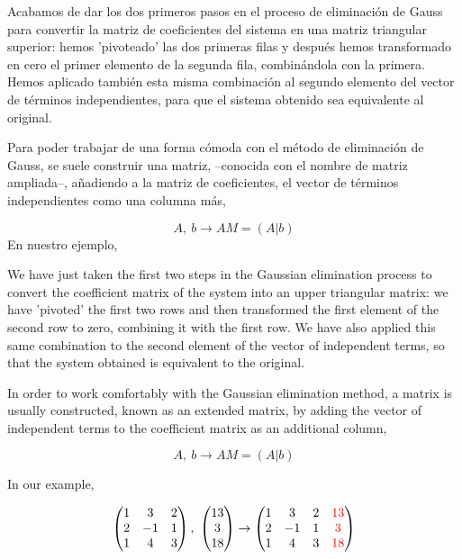 \begin{paracol}{2}
Acabamos de dar los dos primeros pasos en el proceso de eliminación de Gauss para convertir la matriz de coeficientes del sistema en una matriz triangular superior: hemos 'pivoteado' las dos primeras filas y después hemos transformado en cero el primer elemento de la segunda fila, combinándola con la primera. Hemos aplicado también esta misma combinación al segundo elemento del vector de términos independientes, para que el sistema obtenido sea equivalente al original.

Para poder trabajar de una forma cómoda con el método de eliminación de Gauss, se suele construir una matriz, --conocida con el nombre de matriz ampliada--, añadiendo a la matriz de coeficientes, el vector de términos independientes como una columna más,


\begin{equation*}
A,\ b \rightarrow AM=(A\vert b)
\end{equation*} 
En nuestro ejemplo,

\switchcolumn
We have just taken the first two steps in the Gaussian elimination process to convert the coefficient matrix of the system into an upper triangular matrix: we have 'pivoted' the first two rows and then transformed the first element of the second row to zero, combining it with the first row. We have also applied this same combination to the second element of the vector of independent terms, so that the system obtained is equivalent to the original.

In order to work comfortably with the Gaussian elimination method, a matrix is usually constructed, known as an extended matrix, by adding the vector of independent terms to the coefficient matrix as an additional column,

\begin{equation*}
A,\ b \rightarrow AM=(A\vert b)
\end{equation*} 

In our example,
\end{paracol}


\begin{equation*}
\begin{pmatrix}
1& 3& 2\\
2& -1& 1\\
1& 4& 3
\end{pmatrix},\ \begin{pmatrix}
13\\
3\\
18
\end{pmatrix} \rightarrow
\begin{pmatrix}
1& 3& 2& {\color{red}13}\\
2& -1& 1& {\color{red}3}\\
1& 4& 3& {\color{red}18}
\end{pmatrix}
\end{equation*}

